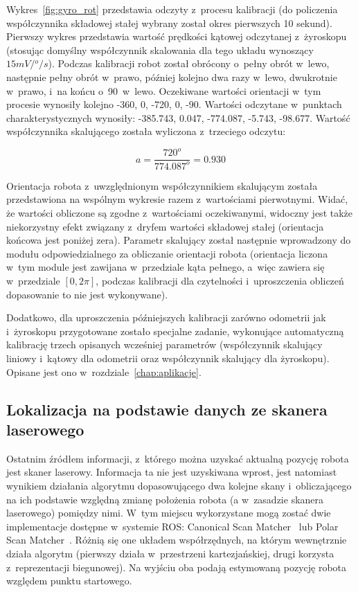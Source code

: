 Wykres~\ref{fig:gyro_rot} przedstawia odczyty z~procesu kalibracji (do
policzenia współczynnika składowej stałej wybrany został okres pierwszych 10
sekund). Pierwszy wykres przedstawia wartość prędkości kątowej odczytanej
z~żyroskopu (stosując domyślny współczynnik skalowania dla tego układu wynoszący
$15mV/{}^o/s$). Podczas kalibracji robot został obrócony o~pełny obrót
w~lewo, następnie pełny obrót w~prawo, później kolejno dwa razy w~lewo, dwukrotnie
w~prawo, i~na końcu o~90\textdegree~w~lewo. Oczekiwane wartości orientacji w~tym
procesie wynosiły kolejno -360\textdegree, 0\textdegree, -720\textdegree,
0\textdegree, -90\textdegree. Wartości odczytane w~punktach charakterystycznych
wynosiły: -385.743\textdegree, 0.047\textdegree, -774.087\textdegree,
-5.743\textdegree, -98.677\textdegree. Wartość współczynnika skalującego została
wyliczona z~trzeciego odczytu:

\[
a = \frac{720^o}{774.087^o} = 0.930
\]

Orientacja robota z~uwzględnionym współczynnikiem skalującym została
przedstawiona na wspólnym wykresie razem z~wartościami pierwotnymi. Widać, że
wartości obliczone są zgodne z~wartościami oczekiwanymi, widoczny jest także
niekorzystny efekt związany z~dryfem wartości składowej stałej (orientacja
końcowa jest poniżej zera). Parametr skalujący został następnie wprowadzony
do modułu odpowiedzialnego za obliczanie orientacji robota (orientacja liczona
w~tym module jest zawijana w~przedziale kąta pełnego, a~więc zawiera się
w~przedziale $[0, 2\pi]$, podczas kalibracji dla czytelności i~uproszczenia
obliczeń dopasowanie to nie jest wykonywane).

Dodatkowo, dla uproszczenia późniejszych kalibracji zarówno odometrii jak
i~żyroskopu przygotowane zostało specjalne zadanie, wykonujące automatyczną
kalibrację trzech opisanych wcześniej parametrów (współczynnik skalujący
liniowy i~kątowy dla odometrii oraz współczynnik skalujący dla żyroskopu).
Opisane jest ono w~rozdziale~\ref{chap:aplikacje}.

\subsection{Lokalizacja na podstawie danych ze skanera laserowego}

Ostatnim źródłem informacji, z~którego można uzyskać aktualną pozycję robota
jest skaner laserowy. Informacja ta nie jest uzyskiwana wprost, jest natomiast
wynikiem działania algorytmu dopasowującego dwa kolejne skany i~obliczającego
na ich podstawie względną zmianę położenia robota (a w~zasadzie skanera laserowego)
pomiędzy nimi. W~tym miejscu wykorzystane mogą zostać dwie implementacje
dostępne w~systemie ROS: Canonical Scan Matcher~\cite{4543181} lub Polar Scan
Matcher~\cite{laser_slam}. Różnią się one układem współrzędnych, na którym
wewnętrznie działa algorytm (pierwszy działa w~przestrzeni kartezjańskiej,
drugi korzysta z~reprezentacji biegunowej). Na wyjściu oba podają estymowaną
pozycję robota względem punktu startowego.

